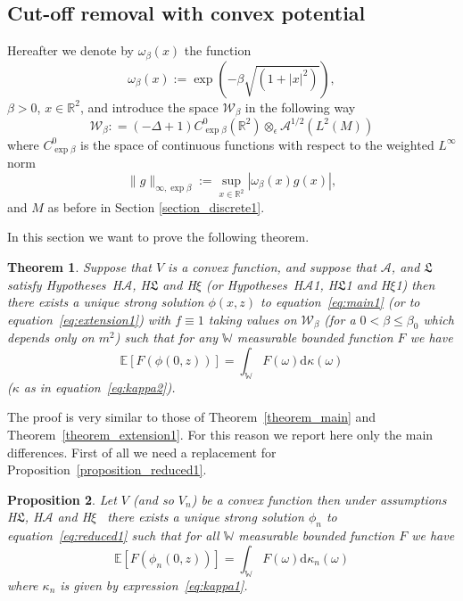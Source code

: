 \documentclass[a4paper,10pt]{article}
\newcommand{\assign}{:=}
\newcommand{\mathd}{\mathrm{d}}
\newtheorem{theorem}{Theorem}
\newtheorem{proposition}[theorem]{Proposition}
{\theorembodyfont{\rmfamily}\newtheorem{remark}[theorem]{Remark}}
\begin{document}
\subsection{Cut-off removal with convex
potential}\label{subsection_extension2}

Hereafter we denote by $\omega_{\beta} (x)$ the function
\begin{equation}
  \omega_{\beta} (x) \assign \exp (- \beta \sqrt{(1 + | x |^2)}),
  \label{eq:exponentialweight}
\end{equation}
$\beta > 0$, $x \in \mathbb{R}^2$, and introduce the space
$\mathcal{W}_{\beta}$ in the following way
\[ \mathcal{W}_{\beta} : = (- \Delta + 1) C^0_{\exp \beta} (\mathbb{R}^2)
   \otimes_{\epsilon} \mathcal{A}^{1 / 2} (L^2 (M)) \]
where $C^0_{\exp \beta}$ is the space of continuous functions with respect to
the weighted $L^{\infty}$ norm
\[ \| g \|_{\infty, \exp \beta} \assign \sup_{x \in \mathbb{R}^2} |
   \omega_{\beta} (x) g (x) |, \]
and $M$ as before in Section \ref{section_discrete1}.

In this section we want to prove the following theorem.

\begin{theorem}
  \label{theorem_extension2}Suppose that $V$ is a convex function, and suppose
  that $\mathcal{A}$, and $\mathfrak{L}$ satisfy Hypotheses~H$\mathcal{A}$,
  H$\mathfrak{L}$ and H$\xi$ (or Hypotheses~H$\mathcal{A}$1, H$\mathfrak{L}$1
  and H$\xi$1) then there exists a unique strong solution $\phi (x, z)$ to
  equation~{\eqref{eq:main1}} (or to equation~{\eqref{eq:extension1}}) with $f
  \equiv 1$ taking values on $\mathcal{W}_{\beta}$ (for a $0 < \beta \leqslant
  \beta_0$ which depends only on $m^2$) such that for any $\mathbb{W}$
  measurable bounded function $F$ we have
  \begin{equation}
    \mathbb{E} [F (\phi (0, z))] = \int_{\mathbb{W}} F (\omega) \mathd \kappa
    (\omega) \label{eq:extension4}
  \end{equation}
  ($\kappa$ as in equation~{\eqref{eq:kappa2}}).
\end{theorem}

The proof is very similar to those of Theorem~\ref{theorem_main} and
Theorem~\ref{theorem_extension1}. For this reason we report here only the main
differences. First of all we need a replacement for
Proposition~\ref{proposition_reduced1}.

\begin{proposition}
  \label{proposition_extension1}Let $V$ (and so $V_n$) be a convex function
  then under assumptions H$\mathfrak{L}$, H$\mathcal{A}$ and H$\xi$ \ there
  exists a unique strong solution $\phi_n$ to equation~{\eqref{eq:reduced1}}
  such that for all $\mathbb{W}$ measurable bounded function $F$ we have
  \begin{equation}
    \mathbb{E} [F (\phi_n (0, z))] = \int_{\mathbb{W}} F (\omega) \mathd
    \kappa_n (\omega) \label{eq:reduced9}
  \end{equation}
  where $\kappa_n$ is given by expression~{\eqref{eq:kappa1}}.
\end{proposition}
\end{document}
